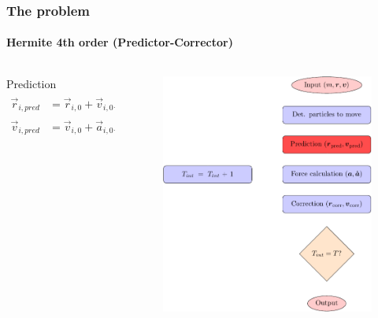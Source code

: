\begin{frame}
    \frametitle{The {\nbody} problem}
    \framesubtitle{Hermite 4th order (Predictor-Corrector)}
    \begin{columns}
        \begin{column}{0.6\textwidth}
        \begin{block}{Prediction}
        \footnotesize
        \begin{align*}
            \vec{r}_{i,pred} &= \vec{r}_{i,0} +
                            \vec{v}_{i,0} \Delta t_{i}  +
                            \vec{a}_{i,0} \frac{\Delta t^{2}_{i}}{2!} +
                            \vec{\dot{a}}_{i,0} \frac{\Delta t^{3}_{i}}{3!} \\
            \vec{v}_{i,pred} &= \vec{v}_{i,0} +
                            \vec{a}_{i,0} \Delta t_{i}  +
                            \vec{\dot{a}}_{i,0} \frac{\Delta t^{2}_{i}}{2!}
        \end{align*}

        \end{block}
        \end{column}
        \begin{column}{0.4\textwidth}
            \begin{figure}
                \centering
                \includegraphics[height=0.55\textheight]{img/algorithm1}
                \label{fig:algoritmo}
            \end{figure}
        \end{column}
    \end{columns}
\end{frame}


